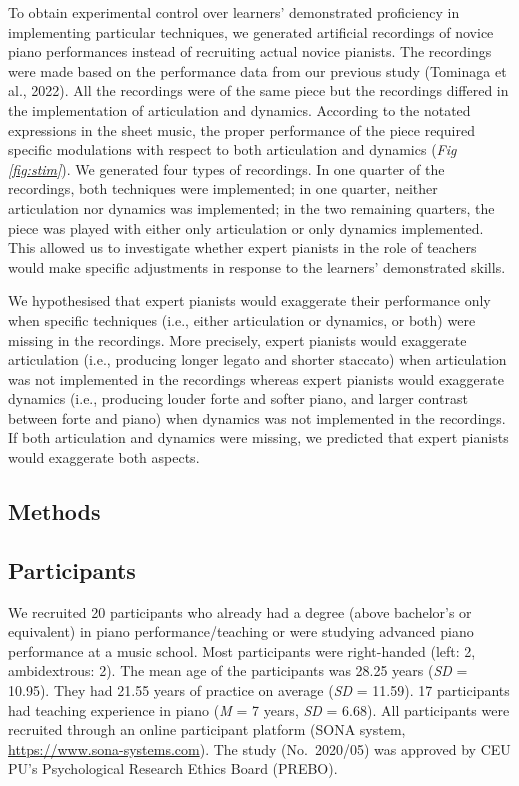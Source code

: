 \documentclass[
  man,floatsintext]{apa6}
\begin{document}
To obtain experimental control over learners' demonstrated proficiency in implementing particular techniques, we generated artificial recordings of novice piano performances instead of recruiting actual novice pianists. The recordings were made based on the performance data from our previous study (Tominaga et al., 2022). All the recordings were of the same piece but the recordings differed in the implementation of articulation and dynamics. According to the notated expressions in the sheet music, the proper performance of the piece required specific modulations with respect to both articulation and dynamics (\emph{Fig \ref{fig:stim}}). We generated four types of recordings. In one quarter of the recordings, both techniques were implemented; in one quarter, neither articulation nor dynamics was implemented; in the two remaining quarters, the piece was played with either only articulation or only dynamics implemented. This allowed us to investigate whether expert pianists in the role of teachers would make specific adjustments in response to the learners' demonstrated skills.

We hypothesised that expert pianists would exaggerate their performance only when specific techniques (i.e., either articulation or dynamics, or both) were missing in the recordings. More precisely, expert pianists would exaggerate articulation (i.e., producing longer legato and shorter staccato) when articulation was not implemented in the recordings whereas expert pianists would exaggerate dynamics (i.e., producing louder forte and softer piano, and larger contrast between forte and piano) when dynamics was not implemented in the recordings. If both articulation and dynamics were missing, we predicted that expert pianists would exaggerate both aspects.

\hypertarget{methods}{%
\subsection{Methods}\label{methods}}

\hypertarget{participants}{%
\subsection{Participants}\label{participants}}

We recruited 20 participants who already had a degree (above bachelor's or equivalent) in piano performance/teaching or were studying advanced piano performance at a music school. Most participants were right-handed (left: 2, ambidextrous: 2). The mean age of the participants was 28.25 years (\emph{SD} = 10.95). They had 21.55 years of practice on average (\emph{SD} = 11.59). 17 participants had teaching experience in piano (\emph{M} = 7 years, \emph{SD} = 6.68). All participants were recruited through an online participant platform (SONA system, \url{https://www.sona-systems.com}). The study (No.~2020/05) was approved by CEU PU's Psychological Research Ethics Board (PREBO).
\end{document}
